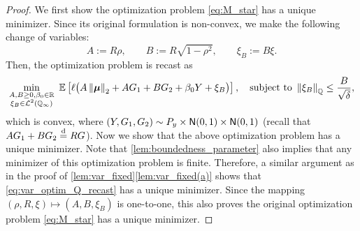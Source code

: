 \begin{proof}
    We first show the optimization problem \cref{eq:M_star} has a unique minimizer. Since its original formulation is non-convex, we make the following change of variables:
    \begin{equation}\label{eq:change_var_AB}
        A := R \rho, \qquad B := R \sqrt{1 - \rho^2}, \qquad \xi_B := B \xi.
    \end{equation}
    Then, the optimization problem is recast as
    \begin{equation}\label{eq:var_optim_Q_recast}
        \min_{
        \substack{ A , B \ge 0, \beta_0 \in \R \\ \xi_B \in \cL^2(\Q_\infty)}
        } \ \E \left[ \ell \bigl( A \norm{\vmu}_2 + A G_1 + B G_2 + \beta_0 Y + \xi_B \bigr) \right], \quad \text{subject to} \ \norm{\xi_B}_{\Q} \le \frac{B}{\sqrt{\delta}},
    \end{equation}
    which is convex, where $(Y, G_1, G_2) \sim P_y \times {\sf N}(0, 1) \times {\sf N}(0, 1)$ (recall that $A G_1 + B G_2 \overset{\smash{\mathrm{d}}}{=} R G$). Now we show that the above optimization problem has a unique minimizer. Note that \cref{lem:boundedness_parameter} also implies that any minimizer of this optimization problem is finite. Therefore, a similar argument as in the proof of \cref{lem:var_fixed}\ref{lem:var_fixed(a)} shows that \cref{eq:var_optim_Q_recast} has a unique minimizer. Since the mapping $(\rho, R, \xi) \mapsto (A, B, \xi_B)$ is one-to-one, this also proves the original optimization problem \cref{eq:M_star} has a unique minimizer.
    

\end{proof}
